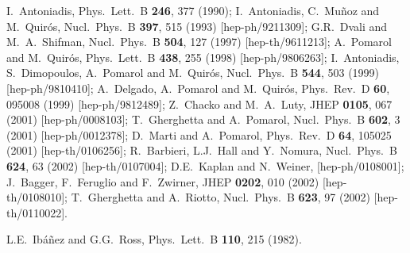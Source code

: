 \documentclass[12pt]{article}
\begin{document}
\begin{thebibliography}{999}
I.~Antoniadis,
  Phys.\ Lett.\ B {\bf 246}, 377 (1990);
I.~Antoniadis, C.~Mu\~noz and M.~Quir\'os,
  Nucl.\ Phys.\ B {\bf 397}, 515 (1993)
  [hep-ph/9211309];
G.R.~Dvali and M.~A.~Shifman,
  Nucl.\ Phys.\ B {\bf 504}, 127 (1997)
  [hep-th/9611213];
A.~Pomarol and M.~Quir\'os,
  Phys.\ Lett.\ B {\bf 438}, 255 (1998)
  [hep-ph/9806263];
I.~Antoniadis, S.~Dimopoulos, A.~Pomarol and M.~Quir\'os,
  Nucl.\ Phys.\ B {\bf 544}, 503 (1999)
  [hep-ph/9810410];
A.~Delgado, A.~Pomarol and M.~Quir\'os,
  Phys.\ Rev.\ D {\bf 60}, 095008 (1999)
  [hep-ph/9812489];
Z.~Chacko and M.~A.~Luty,
  JHEP {\bf 0105}, 067 (2001)
  [hep-ph/0008103];
T.~Gherghetta and A.~Pomarol,
  Nucl.\ Phys.\ B {\bf 602}, 3 (2001)
  [hep-ph/0012378];
D.~Marti and A.~Pomarol,
  Phys.\ Rev.\ D {\bf 64}, 105025 (2001)
  [hep-th/0106256];
R.~Barbieri, L.J.~Hall and Y.~Nomura,
  Nucl.\ Phys.\ B {\bf 624}, 63 (2002)
  [hep-th/0107004];
D.E.~Kaplan and N.~Weiner,
  [hep-ph/0108001];
J.~Bagger, F.~Feruglio and F.~Zwirner,
  JHEP {\bf 0202}, 010 (2002)
  [hep-th/0108010];
T.~Gherghetta and A.~Riotto,
  Nucl.\ Phys.\ B {\bf 623}, 97 (2002)
  [hep-th/0110022].

L.E.~Ib\'a\~nez and G.G.~Ross, 
  Phys.\ Lett.\ B {\bf 110}, 215 (1982).


\end{thebibliography}
\end{document}
